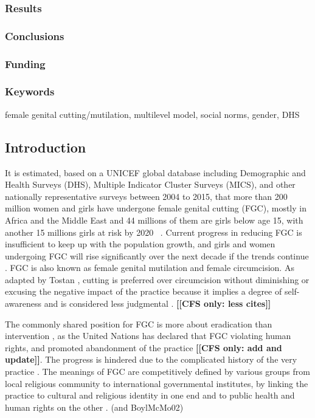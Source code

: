 \documentclass[12pt,]{article}
\newcommand{\comment}[1]{\textbf{[[#1]]}}
\newcommand{\cfonly}[1]{\comment{CFS only: #1}}
\begin{document}
\subsubsection{Results}\label{results}

\subsubsection{Conclusions}\label{conclusions}

\subsubsection{Funding}\label{funding}

\subsubsection{Keywords}\label{keywords}

female genital cutting/mutilation, multilevel model, social norms, gender, DHS

\subsection{Introduction}\label{introduction}

It is estimated, based on a UNICEF global database including Demographic and Health Surveys (DHS), Multiple Indicator Cluster Surveys (MICS),  and other nationally representative surveys between 2004 to 2015, that more than 200 million women and girls have undergone female genital cutting (FGC), mostly in Africa and the Middle East and 44 millions of them are girls below age 15, with another 15 millions girls at risk by 2020  \cite{AdnrLesc16, UNIC16}.  Current progress in reducing FGC is insufficient to keep up with the population growth, and girls and women undergoing FGC will rise significantly over the next decade if the trends continue \cite{KhosBane17, UNIC16}.  FGC is also known as female genital mutilation and female circumcision.  As adapted by Tostan \cite{Tost15}, cutting is preferred over circumcision without diminishing or excusing the negative impact of the practice because it implies a degree of self-awareness and is considered less judgmental  \cite{KhahBark09, JohnEsse10, Meye00, PariSaru18, Shel01, Tost15}. \cfonly{less cites}

The commonly shared position for FGC is more about eradication than intervention \cite{KhosBane17, Mack96, Toub94, UNIC16, WHO97}, as the United Nations has declared that FGC violating human rights, and promoted abandonment of the practice  \cite{WHO97, WHO08} \cfonly{add and update}.  The progress is hindered due to the complicated history of the very practice \cite{BergDeni12, Cami16}. The meanings of FGC are competitively defined by various groups from local religious community to international governmental institutes, by linking the practice to cultural and religious identity in one end and to public health and human rights on the other \cite{AhmeKare18, BergDeni13a, Boyl02, Grue01, KhosBane17, KimaShell18, SchuLien13, WHO12}. (and BoylMcMo02)
\end{document}
